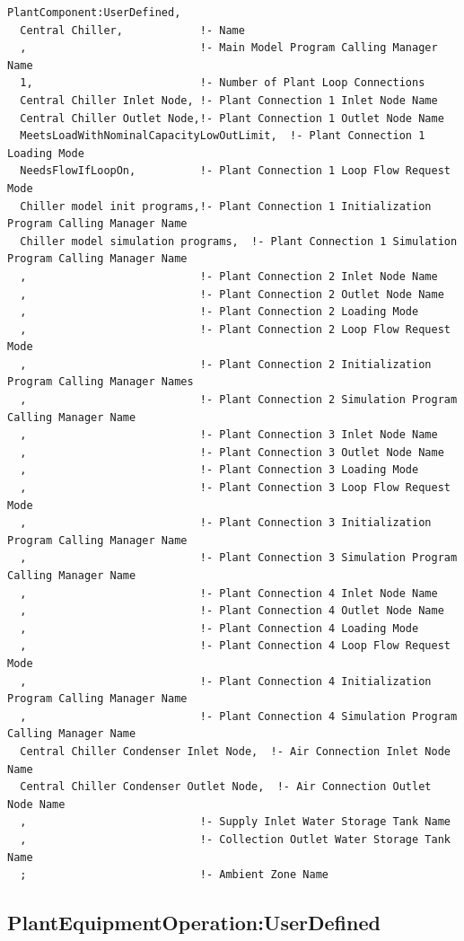 \begin{lstlisting}
PlantComponent:UserDefined,
  Central Chiller,            !- Name
  ,                           !- Main Model Program Calling Manager Name
  1,                          !- Number of Plant Loop Connections
  Central Chiller Inlet Node, !- Plant Connection 1 Inlet Node Name
  Central Chiller Outlet Node,!- Plant Connection 1 Outlet Node Name
  MeetsLoadWithNominalCapacityLowOutLimit,  !- Plant Connection 1 Loading Mode
  NeedsFlowIfLoopOn,          !- Plant Connection 1 Loop Flow Request Mode
  Chiller model init programs,!- Plant Connection 1 Initialization Program Calling Manager Name
  Chiller model simulation programs,  !- Plant Connection 1 Simulation Program Calling Manager Name
  ,                           !- Plant Connection 2 Inlet Node Name
  ,                           !- Plant Connection 2 Outlet Node Name
  ,                           !- Plant Connection 2 Loading Mode
  ,                           !- Plant Connection 2 Loop Flow Request Mode
  ,                           !- Plant Connection 2 Initialization Program Calling Manager Names
  ,                           !- Plant Connection 2 Simulation Program Calling Manager Name
  ,                           !- Plant Connection 3 Inlet Node Name
  ,                           !- Plant Connection 3 Outlet Node Name
  ,                           !- Plant Connection 3 Loading Mode
  ,                           !- Plant Connection 3 Loop Flow Request Mode
  ,                           !- Plant Connection 3 Initialization Program Calling Manager Name
  ,                           !- Plant Connection 3 Simulation Program Calling Manager Name
  ,                           !- Plant Connection 4 Inlet Node Name
  ,                           !- Plant Connection 4 Outlet Node Name
  ,                           !- Plant Connection 4 Loading Mode
  ,                           !- Plant Connection 4 Loop Flow Request Mode
  ,                           !- Plant Connection 4 Initialization Program Calling Manager Name
  ,                           !- Plant Connection 4 Simulation Program Calling Manager Name
  Central Chiller Condenser Inlet Node,  !- Air Connection Inlet Node Name
  Central Chiller Condenser Outlet Node,  !- Air Connection Outlet Node Name
  ,                           !- Supply Inlet Water Storage Tank Name
  ,                           !- Collection Outlet Water Storage Tank Name
  ;                           !- Ambient Zone Name
\end{lstlisting}

\subsection{PlantEquipmentOperation:UserDefined}\label{plantequipmentoperationuserdefined}

